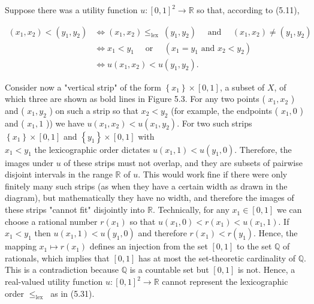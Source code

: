 \documentclass[12pt]{article}
\begin{document}
Suppose there was a utility function $u:[0,1]^{2} \rightarrow \mathbb{R}$ so that, according to (5.11),


\begin{align*}
\left(x_{1}, x_{2}\right)<\left(y_{1}, y_{2}\right) & \Leftrightarrow\left(x_{1}, x_{2}\right) \leq_{\text {lex }}\left(y_{1}, y_{2}\right) \quad \text { and } \quad\left(x_{1}, x_{2}\right) \neq\left(y_{1}, y_{2}\right) \\
& \Leftrightarrow x_{1}<y_{1} \quad \text { or } \quad\left(x_{1}=y_{1} \text { and } x_{2}<y_{2}\right) \\
& \Leftrightarrow u\left(x_{1}, x_{2}\right)<u\left(y_{1}, y_{2}\right) . \tag{5.31}
\end{align*}


Consider now a "vertical strip" of the form $\left\{x_{1}\right\} \times[0,1]$, a subset of $X$, of which three are shown as bold lines in Figure 5.3. For any two points ( $x_{1}, x_{2}$ ) and ( $x_{1}, y_{2}$ ) on such a strip so that $x_{2}<y_{2}$ (for example, the endpoints ( $x_{1}, 0$ ) and ( $x_{1}, 1$ )) we have $u\left(x_{1}, x_{2}\right)<u\left(x_{1}, y_{2}\right)$. For two such strips $\left\{x_{1}\right\} \times[0,1]$ and $\left\{y_{1}\right\} \times[0,1]$ with\\
$x_{1}<y_{1}$ the lexicographic order dictates $u\left(x_{1}, 1\right)<u\left(y_{1}, 0\right)$. Therefore, the images under $u$ of these strips must not overlap, and they are subsets of pairwise disjoint intervals in the range $\mathbb{R}$ of $u$. This would work fine if there were only finitely many such strips (as when they have a certain width as drawn in the diagram), but mathematically they have no width, and therefore the images of these strips "cannot fit" disjointly into $\mathbb{R}$. Technically, for any $x_{1} \in[0,1]$ we can choose a rational number $r\left(x_{1}\right)$ so that $u\left(x_{1}, 0\right)<r\left(x_{1}\right)<u\left(x_{1}, 1\right)$. If $x_{1}<y_{1}$ then $u\left(x_{1}, 1\right)<u\left(y_{1}, 0\right)$ and therefore $r\left(x_{1}\right)<r\left(y_{1}\right)$. Hence, the mapping $x_{1} \mapsto r\left(x_{1}\right)$ defines an injection from the set $[0,1]$ to the set $\mathbb{Q}$ of rationals, which implies that $[0,1]$ has at most the set-theoretic cardinality of $\mathbb{Q}$. This is a contradiction because $\mathbb{Q}$ is a countable set but $[0,1]$ is not. Hence, a real-valued utility function $u:[0,1]^{2} \rightarrow \mathbb{R}$ cannot represent the lexicographic order $\leq_{\text {lex }}$ as in (5.31).
\end{document}
